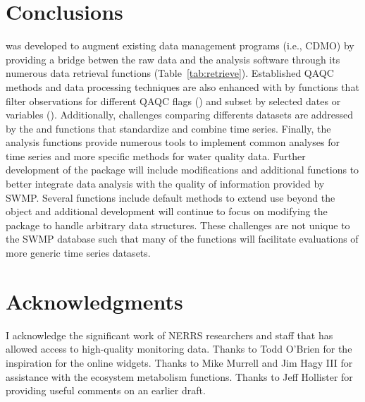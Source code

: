 \section{Conclusions}

 was developed to augment existing data management programs (i.e., CDMO) by providing a bridge betwen the raw data and the analysis software through its numerous data retrieval functions (Table~\ref{tab:retrieve}).  Established QAQC methods and data processing techniques are also enhanced with  by functions that filter observations for different QAQC flags () and subset by selected dates or variables ().  Additionally, challenges comparing differents datasets are addressed by the  and  functions that standardize and combine time series.  Finally, the analysis functions provide numerous tools to implement common analyses for time series and more specific methods for water quality data.  Further development of the package will include modifications and additional functions to better integrate data analysis with the quality of information provided by SWMP.  Several functions include default methods to extend use beyond the  object and additional development will continue to focus on modifying the package to handle arbitrary data structures.  These challenges are not unique to the SWMP database such that many of the functions will facilitate evaluations of more generic time series datasets.  

\section{Acknowledgments}

I acknowledge the significant work of NERRS researchers and staff that has allowed access to high-quality monitoring data.  Thanks to Todd O'Brien for the inspiration for the online widgets. Thanks to Mike Murrell and Jim Hagy III for assistance with the ecosystem metabolism functions. Thanks to Jeff Hollister for providing useful comments on an earlier draft.



\address{Marcus W Beck\\
  US Environmental Protection Agency\\
  National Health and Environmental Effects Research Laboratory\\
  Gulf Ecology Division\\
  1 Sabine Island Drive, Gulf Breeze, FL 32651\\
  USA\\}
